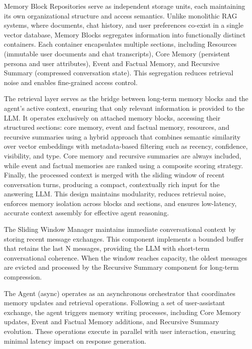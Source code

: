 ﻿\documentclass[12pt,a4paper]{article}
\begin{document}
Memory Block Repositories serve as independent storage units, each maintaining its own organizational structure and access semantics. Unlike monolithic RAG systems, where documents, chat history, and user preferences co-exist in a single vector database, Memory Blocks segregates information into functionally distinct containers. Each container encapsulates multiple sections, including Resources (immutable user documents and chat transcripts), Core Memory (persistent persona and user attributes), Event and Factual Memory, and Recursive Summary (compressed conversation state). This segregation reduces retrieval noise and enables fine-grained access control.


The retrieval layer serves as the bridge between long-term memory blocks and the agent's active context, ensuring that only relevant information is provided to the LLM. It operates exclusively on attached memory blocks, accessing their structured sections: core memory, event and factual memory, resources, and recursive summaries using a hybrid approach that combines semantic similarity over vector embeddings with metadata-based filtering such as recency, confidence, visibility, and type. Core memory and recursive summaries are always included, while event and factual memories are ranked using a composite scoring strategy. Finally, the processed context is merged with the sliding window of recent conversation turns, producing a compact, contextually rich input for the answering LLM. This design maintains modularity, reduces retrieval noise, enforces memory isolation across blocks and sections, and ensures low-latency, accurate context assembly for effective agent reasoning.

The Sliding Window Manager maintains immediate conversational context by storing recent message exchanges. This component implements a bounded buffer that retains the last N messages, providing the LLM with short-term conversational coherence. When the window reaches capacity, the oldest messages are evicted and processed by the Recursive Summary component for long-term compression.

The Agent (async) operates as an asynchronous orchestrator that coordinates memory updates and retrieval operations. Following a set of user-assistant exchange, the agent triggers memory writing processes, including Core Memory updates, Event and Factual Memory additions, and Recursive Summary evolution. These operations execute in parallel with user interaction, ensuring minimal latency impact on response generation.
\end{document}
